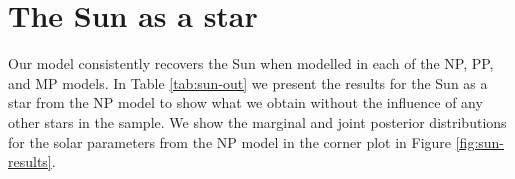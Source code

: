 \documentclass[a4paper,fleqn,usenatbib]{mnras}
\begin{document}



\section{The Sun as a star}\label{sec:sun-res}


Our model consistently recovers the Sun when modelled in each of the NP, PP, and MP models. In Table \ref{tab:sun-out} we present the results for the Sun as a star from the NP model to show what we obtain without the influence of any other stars in the sample. We show the marginal and joint posterior distributions for the solar parameters from the NP model in the corner plot in Figure \ref{fig:sun-results}.
\end{document}
